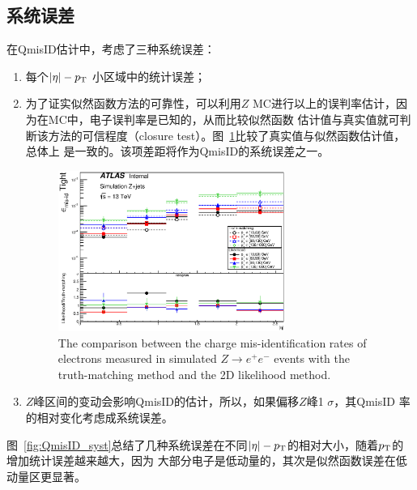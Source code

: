 \subsection{系统误差}
在QmisID估计中，考虑了三种系统误差：
\begin{enumerate}
 \item 每个$|\eta|-p_{\text{T}}$ 小区域中的统计误差；
 \item 为了证实似然函数方法的可靠性，可以利用$Z$ MC进行以上的误判率估计，因为在MC中，电子误判率是已知的，从而比较似然函数
估计值与真实值就可判断该方法的可信程度（closure test）。图~\ref{fig:QmisID_TMLik}比较了真实值与似然函数估计值，总体上
是一致的。该项差距将作为QmisID的系统误差之一。
\begin{figure}[h]
\centering
 \includegraphics[width=0.70\textwidth]{fig/QmisID/TMLik_tight.eps}
 \caption{The comparison between the charge mis-identification rates of electrons measured in simulated $Z\rightarrow e^{+}e^{-}$ events with the truth-matching method and the 2D likelihood method.}
\label{fig:QmisID_TMLik}
\end{figure}

 \item $Z$峰区间的变动会影响QmisID的估计，所以，如果偏移$Z$峰1 $\sigma$，其QmisID 率的相对变化考虑成系统误差。
\end{enumerate}
图~\ref{fig:QmisID_syst}总结了几种系统误差在不同$|\eta|-p_{\text{T}}$的相对大小，随着$p_{\text{T}}$的增加统计误差越来越大，因为
大部分电子是低动量的，其次是似然函数误差在低动量区更显著。
